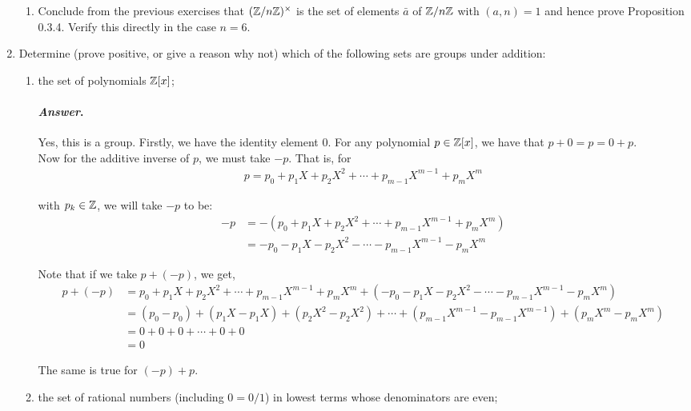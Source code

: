 \documentclass[11pt, reqno]{amsart}
\theoremstyle{plain}
\theoremstyle{definition}
\theoremstyle{example}
\newenvironment{ans}{\color{black}\medskip \paragraph*{\emph{Answer}.}}{\hfill \break  $~\!\!$ \dotfill \medskip }
\begin{document}
\begin{enumerate}[1.]
\begin{enumerate}
\item Conclude from the previous  exercises that $(\mathbb{Z}/n\mathbb{Z})^\times$ is the set of elements $\bar{a}$ of $\mathbb{Z}/n\mathbb{Z}$ with $(a,n) = 1$ and hence prove Proposition 0.3.4. Verify this directly in the case $n = 6$. 


%
\end{enumerate}



\item	Determine (prove positive, or give a reason why not) which of the following sets are groups under addition:
\begin{enumerate}
\item the set of polynomials $\mathbb{Z}[x]$;
	
\begin{ans}
Yes, this is a group. Firstly, we have the identity element $0$. For any polynomial $p \in \mathbb{Z}[x]$, we have that $p + 0 = p = 0 + p$.\\

Now for the additive inverse of $p$, we must take $-p$. That is, for
\begin{align*}
p = p_0 + p_1 X + p_2 X^2 + \cdots + p_{m - 1} X^{m - 1} + p_m X^m
\end{align*}

with $p_k \in \mathbb{Z}$, we will take $-p$ to be:
\begin{align*}
-p &= -(p_0 + p_1 X + p_2 X^2 + \cdots + p_{m - 1} X^{m - 1} + p_m X^m)\\
&= -p_0 - p_1 X - p_2 X^2 - \cdots - p_{m - 1} X^{m - 1} - p_m X^m
\end{align*}

Note that if we take $p + (-p)$, we get,
\begin{align*}
p + (-p) &= p_0 + p_1 X + p_2 X^2 + \cdots + p_{m - 1} X^{m - 1} + p_m X^m + (-p_0 - p_1 X - p_2 X^2 - \cdots - p_{m - 1} X^{m - 1} - p_m X^m)\\
&= (p_0 - p_0) + (p_1 X - p_1 X) + (p_2 X^2 - p_2 X^2) + \cdots + (p_{m - 1} X^{m - 1} - p_{m - 1} X^{m - 1}) + (p_m X^m - p_m X^m)\\
&= 0 + 0 + 0 + \cdots + 0 + 0\\
&= 0
\end{align*}

The same is true for $(-p) + p$.
\end{ans}
	
\item the set of rational numbers (including $0=0/1$) in lowest terms whose denominators are even;
	

\end{enumerate}
\end{enumerate}
\end{document}
